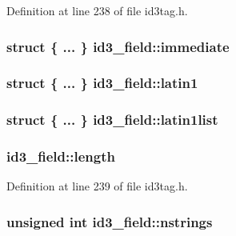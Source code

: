 Definition at line 238 of file id3tag.\+h.

\subsubsection[{\texorpdfstring{immediate}{immediate}}]{\setlength{\rightskip}{0pt plus 5cm}struct \{ ... \}   id3\+\_\+field\+::immediate}\hypertarget{unionid3__field_a652cc894f2de670e5be004c545e76085}{}\label{unionid3__field_a652cc894f2de670e5be004c545e76085}
\subsubsection[{\texorpdfstring{latin1}{latin1}}]{\setlength{\rightskip}{0pt plus 5cm}struct \{ ... \}   id3\+\_\+field\+::latin1}\hypertarget{unionid3__field_ab4d98b07661c0f05bab1878360c4dfeb}{}\label{unionid3__field_ab4d98b07661c0f05bab1878360c4dfeb}
\subsubsection[{\texorpdfstring{latin1list}{latin1list}}]{\setlength{\rightskip}{0pt plus 5cm}struct \{ ... \}   id3\+\_\+field\+::latin1list}\hypertarget{unionid3__field_aa7a9819cbd3e23976e1fc6490709a38b}{}\label{unionid3__field_aa7a9819cbd3e23976e1fc6490709a38b}
\subsubsection[{\texorpdfstring{length}{length}}]{ id3\+\_\+field\+::length}\hypertarget{unionid3__field_a2f14aceac1a2afa6e0692d8ac20d1807}{}\label{unionid3__field_a2f14aceac1a2afa6e0692d8ac20d1807}


Definition at line 239 of file id3tag.\+h.

\subsubsection[{\texorpdfstring{nstrings}{nstrings}}]{\setlength{\rightskip}{0pt plus 5cm}unsigned {\bf int} id3\+\_\+field\+::nstrings}\hypertarget{unionid3__field_a4dcaa7d27cb676c7b3450084131a68db}{}\label{unionid3__field_a4dcaa7d27cb676c7b3450084131a68db}


